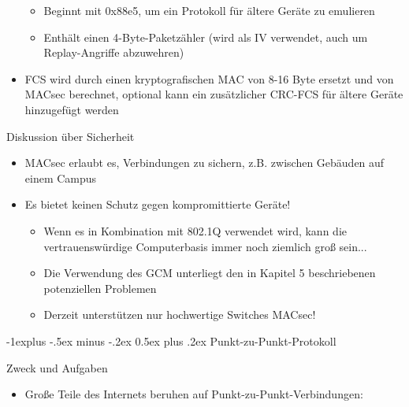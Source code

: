 \documentclass[a4paper]{article}
\makeatletter
\renewcommand{\subsection}{\@startsection{subsection}{2}{0mm}%
 {-1explus -.5ex minus -.2ex}%
 {0.5ex plus .2ex}%
 {\normalfont\normalsize\bfseries}}
\makeatother
\begin{document}
\begin{multicols}{3}
\begin{itemize}
              \begin{itemize}
                  \item
                        Beginnt mit 0x88e5, um ein Protokoll für ältere Geräte zu emulieren
                  \item
                        Enthält einen 4-Byte-Paketzähler (wird als IV verwendet, auch um
                        Replay-Angriffe abzuwehren)
              \end{itemize}
        \item
              FCS wird durch einen kryptografischen MAC von 8-16 Byte ersetzt und
              von MACsec berechnet, optional kann ein zusätzlicher CRC-FCS für
              ältere Geräte hinzugefügt werden
    \end{itemize}

    Diskussion über Sicherheit

    \begin{itemize}
        \item
              MACsec erlaubt es, Verbindungen zu sichern, z.B. zwischen Gebäuden auf
              einem Campus
        \item
              Es bietet keinen Schutz gegen kompromittierte Geräte!

              \begin{itemize}
                  \item
                        Wenn es in Kombination mit 802.1Q verwendet wird, kann die
                        vertrauenswürdige Computerbasis immer noch ziemlich groß sein...
                  \item
                        Die Verwendung des GCM unterliegt den in Kapitel 5 beschriebenen
                        potenziellen Problemen
                  \item
                        Derzeit unterstützen nur hochwertige Switches MACsec!
              \end{itemize}
    \end{itemize}


    \subsection{Punkt-zu-Punkt-Protokoll}

    Zweck und Aufgaben

    \begin{itemize}
        \item
              Große Teile des Internets beruhen auf Punkt-zu-Punkt-Verbindungen:


\end{itemize}
\end{multicols}
\end{document}
